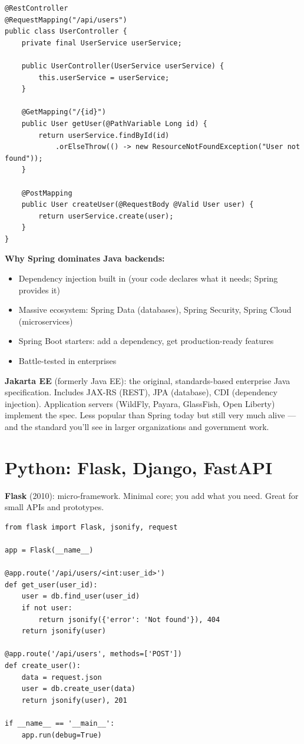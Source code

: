 \documentclass[11pt, letterpaper]{article}
\begin{document}
\begin{lstlisting}[style=code, caption={Spring Boot REST controller}]
@RestController
@RequestMapping("/api/users")
public class UserController {
    private final UserService userService;

    public UserController(UserService userService) {
        this.userService = userService;
    }

    @GetMapping("/{id}")
    public User getUser(@PathVariable Long id) {
        return userService.findById(id)
            .orElseThrow(() -> new ResourceNotFoundException("User not found"));
    }

    @PostMapping
    public User createUser(@RequestBody @Valid User user) {
        return userService.create(user);
    }
}
\end{lstlisting}

\textbf{Why Spring dominates Java backends:}
\begin{itemize}[noitemsep]
  \item Dependency injection built in (your code declares what it needs; Spring provides it)
  \item Massive ecosystem: Spring Data (databases), Spring Security, Spring Cloud (microservices)
  \item Spring Boot starters: add a dependency, get production-ready features
  \item Battle-tested in enterprises
\end{itemize}

\textbf{Jakarta EE} (formerly Java EE): the original, standards-based enterprise Java specification. Includes JAX-RS (REST), JPA (database), CDI (dependency injection). Application servers (WildFly, Payara, GlassFish, Open Liberty) implement the spec. Less popular than Spring today but still very much alive --- and the standard you'll see in larger organizations and government work.

\section*{Python: Flask, Django, FastAPI}

\textbf{Flask} (2010): micro-framework. Minimal core; you add what you need. Great for small APIs and prototypes.

\begin{lstlisting}[style=code, caption={Flask: minimal API}]
from flask import Flask, jsonify, request

app = Flask(__name__)

@app.route('/api/users/<int:user_id>')
def get_user(user_id):
    user = db.find_user(user_id)
    if not user:
        return jsonify({'error': 'Not found'}), 404
    return jsonify(user)

@app.route('/api/users', methods=['POST'])
def create_user():
    data = request.json
    user = db.create_user(data)
    return jsonify(user), 201

if __name__ == '__main__':
    app.run(debug=True)
\end{lstlisting}
\end{document}
